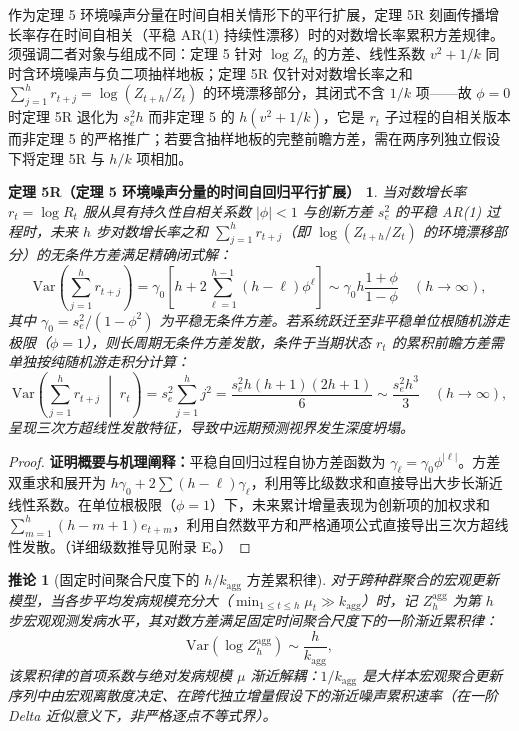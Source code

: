 \documentclass[11pt,a4paper]{article}
\theoremstyle{plain}
\newtheorem*{theorem5R}{定理 5R（定理 5 环境噪声分量的时间自回归平行扩展）}
\newtheorem{corollary}{推论}
\theoremstyle{definition}
\begin{document}
作为定理 5 环境噪声分量在时间自相关情形下的平行扩展，定理 5R 刻画传播增长率存在时间自相关（平稳 AR(1) 持续性漂移）时的对数增长率累积方差规律。须强调二者对象与组成不同：定理 5 针对 $\log Z_h$ 的方差、线性系数 $v^2 + 1/k$ 同时含环境噪声与负二项抽样地板；定理 5R 仅针对对数增长率之和 $\sum_{j=1}^h r_{t+j} = \log(Z_{t+h}/Z_t)$ 的环境漂移部分，其闭式不含 $1/k$ 项——故 $\phi=0$ 时定理 5R 退化为 $s_e^2 h$ 而非定理 5 的 $h(v^2+1/k)$，它是 $r_t$ 子过程的自相关版本而非定理 5 的严格推广；若要含抽样地板的完整前瞻方差，需在两序列独立假设下将定理 5R 与 $h/k$ 项相加。

\begin{theorem5R}\label{thm:t5r}
当对数增长率 $r_t = \log R_t$ 服从具有持久性自相关系数 $|\phi| < 1$ 与创新方差 $s_e^2$ 的平稳 AR(1) 过程时，未来 $h$ 步对数增长率之和 $\sum_{j=1}^h r_{t+j}$（即 $\log(Z_{t+h}/Z_t)$ 的环境漂移部分）的无条件方差满足精确闭式解：
\begin{equation}
\text{Var}\left(\sum_{j=1}^h r_{t+j}\right) = \gamma_0 \left[ h + 2 \sum_{\ell=1}^{h-1} (h-\ell) \phi^\ell \right] \sim \gamma_0 h \frac{1+\phi}{1-\phi} \quad (h \to \infty),
\end{equation}
其中 $\gamma_0 = s_e^2/(1-\phi^2)$ 为平稳无条件方差。若系统跃迁至非平稳单位根随机游走极限（$\phi = 1$），则长周期无条件方差发散，条件于当期状态 $r_t$ 的累积前瞻方差需单独按纯随机游走积分计算：
\begin{equation}
\text{Var}\left(\sum_{j=1}^h r_{t+j} \;\middle|\; r_t\right) = s_e^2 \sum_{j=1}^h j^2 = \frac{s_e^2 h(h+1)(2h+1)}{6} \sim \frac{s_e^2 h^3}{3} \quad (h \to \infty),
\end{equation}
呈现三次方超线性发散特征，导致中远期预测视界发生深度坍塌。
\end{theorem5R}

\begin{proof}
\textbf{证明概要与机理阐释：}平稳自回归过程自协方差函数为 $\gamma_\ell = \gamma_0 \phi^{|\ell|}$。方差双重求和展开为 $h \gamma_0 + 2\sum (h-\ell)\gamma_\ell$，利用等比级数求和直接导出大步长渐近线性系数。在单位根极限（$\phi=1$）下，未来累计增量表现为创新项的加权求和 $\sum_{m=1}^h (h-m+1)e_{t+m}$，利用自然数平方和严格通项公式直接导出三次方超线性发散。（详细级数推导见附录 E。）
\end{proof}

\begin{corollary}[固定时间聚合尺度下的 $h/k_{\text{agg}}$ 方差累积律]\label{cor:pop_floor}
对于跨种群聚合的宏观更新模型，当各步平均发病规模充分大（$\min_{1 \le t \le h} \mu_t \gg k_{\text{agg}}$）时，记 $Z_h^{\text{agg}}$ 为第 $h$ 步宏观观测发病水平，其对数方差满足固定时间聚合尺度下的一阶渐近累积律：
\begin{equation}
\text{Var}(\log Z_h^{\text{agg}}) \sim \frac{h}{k_{\text{agg}}},
\label{eq:pop_floor}
\end{equation}
该累积律的首项系数与绝对发病规模 $\mu$ 渐近解耦：$1/k_{\text{agg}}$ 是大样本宏观聚合更新序列中由宏观离散度决定、在跨代独立增量假设下的渐近噪声累积速率（在一阶 Delta 近似意义下，非严格逐点不等式界）。
\end{corollary}
\end{document}
